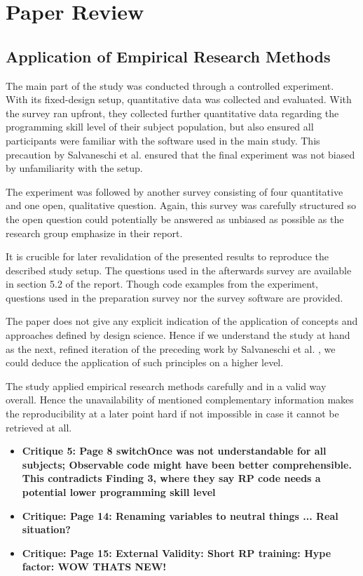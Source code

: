 \documentclass[12pt,a4paper]{article}
\begin{document}
\section{Paper Review}

\subsection{Application of Empirical Research Methods}

The main part of the study was conducted through a controlled experiment. With its fixed-design setup, quantitative data was collected and evaluated. With the survey ran upfront, they collected further quantitative data regarding the programming skill level of their subject population, but also ensured all participants were familiar with the software used in the main study. This precaution by Salvaneschi et al. ensured that the final experiment was not biased by unfamiliarity with the setup.

The experiment was followed by another survey consisting of four quantitative and one open, qualitative question. Again, this survey was carefully structured so the open question could potentially be answered as unbiased as possible as the research group emphasize in their report.

It is crucible for later revalidation of the presented results to reproduce the described study setup. The questions used in the afterwards survey are available in section 5.2 of the report. Though code examples from the experiment, questions used in the preparation survey nor the survey software are provided.

The paper does not give any explicit indication of the application of concepts and approaches defined by design science. Hence if we understand the  study at hand as the next, refined iteration of the preceding work by Salvaneschi et al. \cite{Salvaneschi:2014:ESP:2635868.2635895}, we could deduce the application of such principles on a higher level.

The study applied empirical research methods carefully and in a valid way overall. Hence the unavailability of mentioned complementary information makes the reproducibility at a later point hard if not impossible in case it cannot be retrieved at all.

\begin{itemize}
	\item \textbf{Critique 5: Page 8 switchOnce was not understandable for all subjects; Observable code might have been better comprehensible. This contradicts Finding 3, where they say RP code needs a potential lower programming skill level}
	\item \textbf{Critique: Page 14: Renaming variables to neutral things ... Real situation?}
	\item \textbf{Critique: Page 15: External Validity: Short RP training: Hype factor: WOW THATS NEW!}
\end{itemize}
\end{document}
